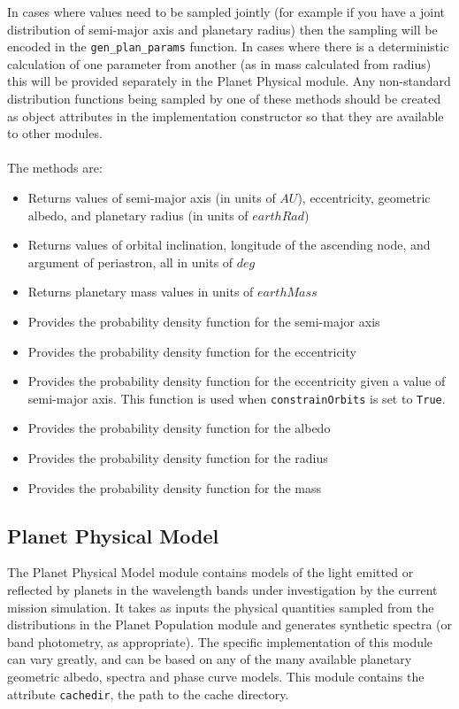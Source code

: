 \documentclass[cleanfoot]{asme2ej}
\begin{document}
In cases where values need to be sampled jointly (for example if you have a joint distribution of semi-major axis and planetary radius) then the sampling will be encoded in the \verb+gen_plan_params+ function.  In cases where there is a deterministic calculation of one parameter from another (as in mass calculated from radius) this will be provided separately in the Planet Physical module. Any non-standard distribution functions being sampled by one of these methods should be created as object attributes in the implementation constructor so that they are available to other modules.
\\\\
The methods are:
\begin{itemize}[leftmargin=1.5in,font={\ttfamily}]
    \item[\texttt gen\_plan\_params] Returns values of semi-major axis (in units of $ AU $), eccentricity, geometric albedo, and planetary radius (in units of $ earthRad $)
    \item[\texttt gen\_angles] Returns values of orbital inclination, longitude of the ascending node, and argument of periastron, all in units of $ deg $
    \item[\texttt gen\_mass] Returns planetary mass values in units of $earthMass$
    \item[\texttt dist\_sma] Provides the probability density function for the semi-major axis
    \item[\texttt dist\_eccen] Provides the probability density function for the eccentricity
    \item[\texttt dist\_eccen\_from\_sma] Provides the probability density function for the eccentricity given a value of semi-major axis. This function is used when \verb+constrainOrbits+ is set to \verb+True+.
    \item[\texttt dist\_albedo] Provides the probability density function for the albedo
    \item[\texttt dist\_radius] Provides the probability density function for the radius
    \item[\texttt dist\_mass] Provides the probability density function for the mass
\end{itemize}



\subsection{Planet Physical Model} \label{sec:planetphysicalmodel}
The Planet Physical Model module contains models of the light emitted or reflected by planets in the wavelength bands under investigation by the current mission simulation.  It takes as inputs the physical quantities sampled from the distributions in the Planet Population module and generates synthetic spectra (or band photometry, as appropriate).  The specific implementation of this module can vary greatly, and can be based on any of the many available planetary geometric albedo, spectra and phase curve models.  This module contains the attribute \texttt{cachedir}, the path to the cache directory.
\end{document}
